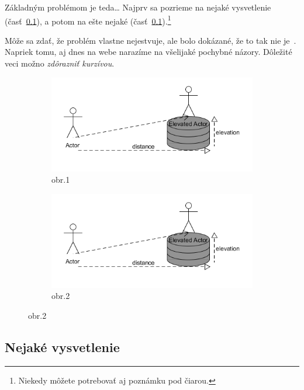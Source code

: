 \documentclass[10pt,twocolumn,twoside,slovak,english,a4paper]{article}
\begin{document}
Základným problémom je teda\ldots{} Najprv sa pozrieme na nejaké vysvetlenie (časť~\ref{ina:nejake}), a potom na ešte nejaké (časť~\ref{ina:nejake}).\footnote{Niekedy môžete potrebovať aj poznámku pod čiarou.}

Môže sa zdať, že problém vlastne nejestvuje\cite{Coplien:MPD}, ale bolo dokázané, že to tak nie je~\cite{Czarnecki:Staged, Czarnecki:Progress}. Napriek tomu, aj dnes na webe narazíme na všelijaké pochybné názory\cite{PLP-Framework}. Dôležité veci možno \emph{zdôrazniť kurzívou}.

\begin{figure}
\caption{Dva obr. vedl’a seba, cez 2 stlpce}\label{fig:animals}
\begin{subfigure}[b]{0.3\textwidth}
\centering
\includegraphics[scale=0.5]{diagram1}
\caption{obr.1}
\end{subfigure}
\begin{subfigure}[b]{0.3\textwidth}
\centering
\includegraphics[scale=0.5]{diagram1}
\caption{obr.2}
\end{subfigure}
\end{figure}




\subsection{Nejaké vysvetlenie} \label{ina:nejake}
\end{document}
